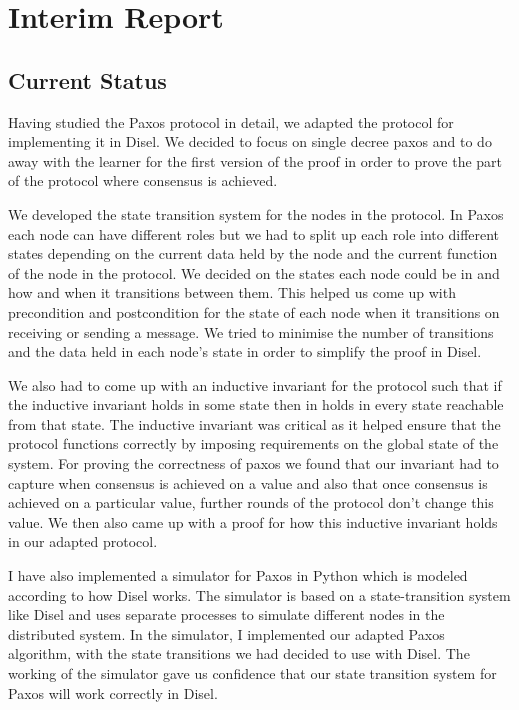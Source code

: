 \chapter{Interim Report}

\section{Current Status}
Having studied the Paxos protocol in detail, we adapted the protocol for implementing it in Disel. We decided to focus on single decree paxos and to do away with the learner for the first version of the proof in order to prove the part of the protocol where consensus is achieved.

We developed the state transition system for the nodes in the protocol. In Paxos each node can have different roles but we had to split up each role into different states depending on the current data held by the node and the current function of the node in the protocol. We decided on the states each node could be in and how and when it transitions between them. This helped us come up with precondition and postcondition for the state of each node when it transitions on receiving or sending a message. We tried to minimise the number of transitions and the data held in each node’s state in order to simplify the proof in Disel.

We also had to come up with an inductive invariant for the protocol such that if the inductive invariant holds in some state then in holds in every state reachable from that state. The inductive invariant was critical as it helped ensure that the protocol functions correctly by imposing requirements on the global state of the system. For proving the correctness of paxos we found that our invariant had to capture when consensus is achieved on a value and also that once consensus is achieved on a particular value, further rounds of the protocol don’t change this value. We then also came up with a proof for how this inductive invariant holds in our adapted protocol.

I have also implemented a simulator for Paxos in Python which is modeled according to how Disel works. The simulator is based on a state-transition system like Disel and uses separate processes to simulate different nodes in the distributed system. In the simulator, I implemented our adapted Paxos algorithm, with the state transitions we had decided to use with Disel. The working of the simulator gave us confidence that our state transition system for Paxos will work correctly in Disel.

